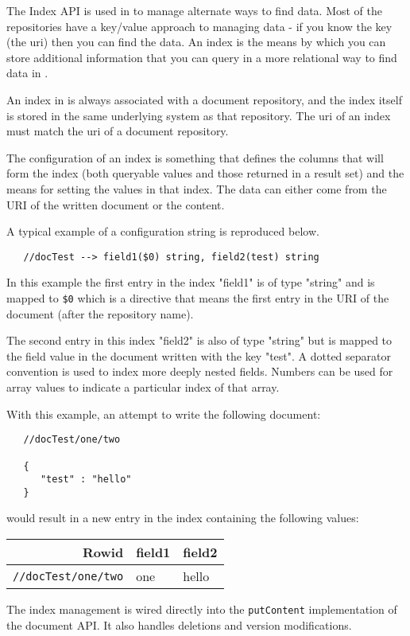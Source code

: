 The Index API is used in \Rapture to manage alternate ways to find data. Most of the
\Rapture repositories have a key/value approach to managing data - if you know the key (the uri) then
you can find the data. An index is the means by which you can
store additional information that you can query in a more relational way to find data in \Rapture.

An index in \Rapture is always associated with a document repository, and the index itself is stored
in the same underlying system as that repository. The uri of an index must match the uri of a document repository.

The configuration of an index is something that defines the columns that will form the index (both queryable values and those returned in a result set) and
the means for setting the values in that index. The data can either come from the URI of the written document or the content.

A typical example of a configuration string is reproduced below.

\begin{Verbatim}
   //docTest --> field1($0) string, field2(test) string
\end{Verbatim}

In this example the first entry in the index "field1" is of type "string" and is mapped to \verb+$0+ which
is a directive that means the first entry in the URI of the document (after the repository name).

The second entry in this index "field2" is also of type "string" but is mapped to the field value in the document written
with the key "test". A dotted separator convention is used to index more deeply nested fields. Numbers can be used for array values
to indicate a particular index of that array.

With this example, an attempt to write the following document:

\begin{Verbatim}
   //docTest/one/two

   {
      "test" : "hello"
   }
\end{Verbatim}

would result in a new entry in the index containing the following values:

\begin{table}[h]
  \small
\begin{center}
\begin{tabular}{r l l}
  Rowid & field1 & field2 \\
  \hline
  \verb+//docTest/one/two+ & one & hello \\
\end{tabular}
\end{center}
\end{table}

The index management is wired directly into the \verb+putContent+ implementation of the
document API. It also handles deletions and version modifications.
